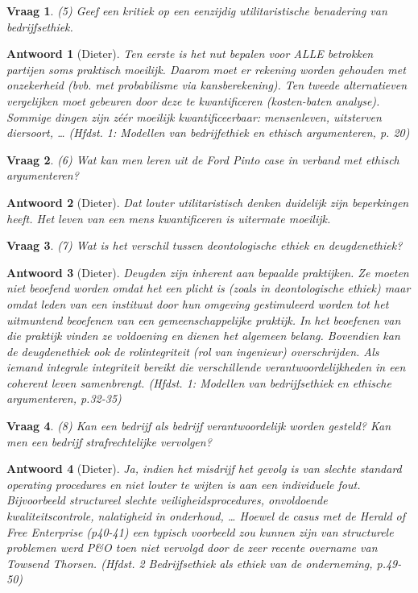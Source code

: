 \documentclass{article}
\theoremstyle{nonumberplain}
\newtheorem{question}{Vraag}
\newtheorem{answer}{Antwoord}
\begin{document}
\begin{question}
(5)	Geef een kritiek op een eenzijdig utilitaristische benadering van bedrijfsethiek.
\end{question}
\begin{answer}[Dieter]
	Ten eerste is het nut bepalen voor ALLE betrokken partijen soms praktisch moeilijk. Daarom moet er rekening worden gehouden met onzekerheid (bvb. met probabilisme via kansberekening).
	Ten tweede alternatieven vergelijken moet gebeuren door deze te kwantificeren (kosten-baten analyse). Sommige dingen zijn z\'e\'er moeilijk kwantificeerbaar: mensenleven, uitsterven diersoort, \ldots
	\textit{(Hfdst. 1: Modellen van bedrijfethiek en ethisch argumenteren, p. 20)}
\end{answer}

\begin{question}
(6)	Wat kan men leren uit de Ford Pinto case in verband met ethisch argumenteren?
\end{question}
\begin{answer}[Dieter]
	Dat louter utilitaristisch denken duidelijk zijn beperkingen heeft.
	Het leven van een mens kwantificeren is uitermate moeilijk.
\end{answer}

\begin{question}
(7)	Wat is het verschil tussen deontologische ethiek en deugdenethiek?
\end{question}
\begin{answer}[Dieter]
	Deugden zijn inherent aan bepaalde praktijken.
	Ze moeten niet beoefend worden omdat het een plicht is (zoals in deontologische ethiek) maar omdat leden van een instituut door hun omgeving gestimuleerd worden tot het uitmuntend beoefenen van een gemeenschappelijke praktijk.
	In het beoefenen van die praktijk vinden ze voldoening en dienen het algemeen belang.
	Bovendien kan de deugdenethiek ook de rolintegriteit (rol van ingenieur) overschrijden.
	Als iemand integrale integriteit bereikt die verschillende verantwoordelijkheden in een coherent leven samenbrengt.
	\textit{(Hfdst. 1: Modellen van bedrijfsethiek en ethische argumenteren, p.32-35)}
\end{answer}

\begin{question}
(8)	Kan een bedrijf als bedrijf verantwoordelijk worden gesteld? Kan men een bedrijf strafrechtelijke vervolgen?
\end{question}
\begin{answer}[Dieter]
	Ja, indien het misdrijf het gevolg is van slechte \emph{standard operating procedures} en niet louter te wijten is aan een individuele fout.
	Bijvoorbeeld structureel slechte veiligheidsprocedures, onvoldoende kwaliteitscontrole, nalatigheid in onderhoud, \ldots
	Hoewel de casus met de Herald of Free Enterprise \textit{(p40-41)} een typisch voorbeeld zou kunnen zijn van structurele problemen werd P\&O toen niet vervolgd door de zeer recente overname van Towsend Thorsen.
	\textit{(Hfdst. 2 Bedrijfsethiek als ethiek van de onderneming, p.49-50)}
\end{answer}
\end{document}
